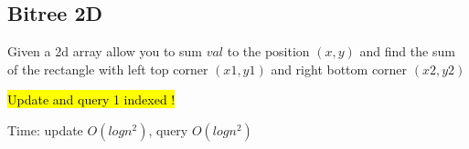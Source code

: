 \subsection{Bitree 2D}

Given a 2d array allow you to sum $val$ to the position $(x, y)$ and find the sum of the rectangle with left top corner $(x1, y1)$ and right bottom corner $(x2, y2)$

\hl{Update and query 1 indexed !}

Time: update $O(log{n^2})$, query $O(log{n^2})$

